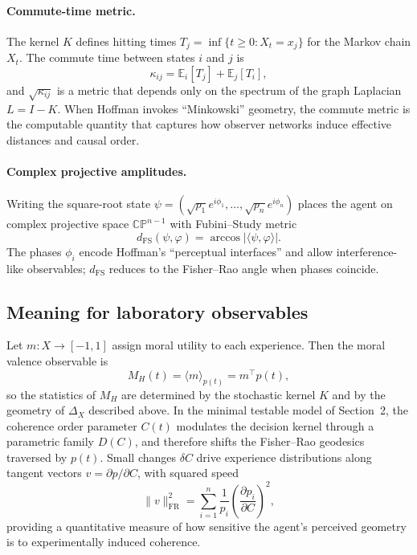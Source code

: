\documentclass[12pt,a4paper]{article}
\theoremstyle{definition}
\begin{document}
\paragraph{Commute-time metric.} The kernel $K$ defines hitting times $T_j = \inf\{ t \ge 0 : X_t = x_j \}$ for the Markov chain $X_t$. The commute time between states $i$ and $j$ is
\begin{equation}
\kappa_{i j} = \mathbb{E}_i[T_j] + \mathbb{E}_j[T_i],
\end{equation}
and $\sqrt{\kappa_{i j}}$ is a metric that depends only on the spectrum of the graph Laplacian $L = I - K$. When Hoffman invokes ``Minkowski'' geometry, the commute metric is the computable quantity that captures how observer networks induce effective distances and causal order.

\paragraph{Complex projective amplitudes.} Writing the square-root state $\psi = (\sqrt{p_1} e^{i \phi_1},\dots,\sqrt{p_n} e^{i \phi_n})$ places the agent on complex projective space $\mathbb{CP}^{n-1}$ with Fubini--Study metric
\begin{equation}
d_{\mathrm{FS}}(\psi,\varphi) = \arccos \big|\langle \psi, \varphi \rangle\big|.
\end{equation}
The phases $\phi_i$ encode Hoffman's ``perceptual interfaces'' and allow interference-like observables; $d_{\mathrm{FS}}$ reduces to the Fisher--Rao angle when phases coincide.

\subsection{Meaning for laboratory observables}

Let $m : X \rightarrow [-1,1]$ assign moral utility to each experience. Then the moral valence observable is
\begin{equation}
M_H(t) = \langle m \rangle_{p(t)} = m^\top p(t),
\end{equation}
so the statistics of $M_H$ are determined by the stochastic kernel $K$ and by the geometry of $\Delta_X$ described above. In the minimal testable model of Section~2, the coherence order parameter $C(t)$ modulates the decision kernel through a parametric family $D(C)$, and therefore shifts the Fisher--Rao geodesics traversed by $p(t)$. Small changes $\delta C$ drive experience distributions along tangent vectors $v = \partial p / \partial C$, with squared speed
\begin{equation}
\|v\|_{\mathrm{FR}}^2 = \sum_{i=1}^n \frac{1}{p_i} \left( \frac{\partial p_i}{\partial C} \right)^2,
\end{equation}
providing a quantitative measure of how sensitive the agent's perceived geometry is to experimentally induced coherence.
\end{document}
